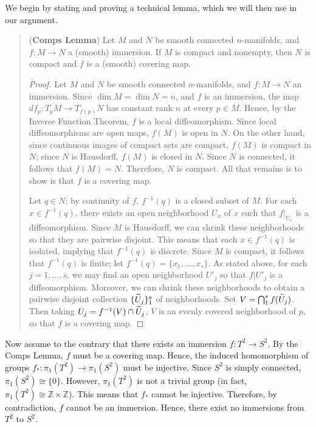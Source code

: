 \documentclass{article}
\begin{document}
\begin{solutions}
	We begin by stating and proving a technical lemma, which we will then use in our argument. 
		\begin{quote}
			(\textbf{Comps Lemma}) Let $M$ and $N$ be smooth connected $n$-manifolds, and $f: M \to N$ a (smooth) immersion. If $M$ is compact and nonempty, then $N$ is compact and $f$ is a (smooth) covering map. 
			
			\begin{proof}
				Let $M$ and $N$ be smooth connected $n$-manifolds, and $f:M \to N$ an immersion. Since $\dim{M} = \dim{N} = n$, and $f$ is an immersion, the map $df_{p}: T_{p}M \to T_{f(p)}N$ has constant rank $n$ at every $p \in M$. Hence, by the Inverse Function Theorem, $f$ is a local diffeomorphism. Since local diffeomorphisms are open maps, $f(M)$ is open in $N$. On the other hand, since continuous images of compact sets are compact, $f(M)$ is compact in $N$; since $N$ is Hausdorff, $f(M)$ is closed in $N$. Since $N$ is connected, it follows that $f(M) = N$. Therefore, $N$ is compact. All that remains is to show is that $f$ is a covering map. 
				
				Let $q \in N$; by continuity of $f$, $f^{-1}(q)$ is a closed subset of $M$. For each $x \in f^{-1}(q)$, there exists an open neighborhood $U_{x}$ of $x$ such that $f|_{U_{x}}$ is a diffeomorphism. Since $M$ is Hausdorff, we can shrink these neighborhoods so that they are pairwise disjoint. This means that each $x \in f^{-1}(q)$ is isolated, implying that $f^{-1}(q)$ is discrete. Since $M$ is compact, it follows that $f^{-1}(q)$ is finite; let $f^{-1}(q) = \{x_{1}, \ldots, x_{s}\}$. As stated above, for each $j= 1, \ldots, s$, we may find an open neighborhood $U'_{j}$ so that $f|U'_{j}$ is a diffeomorphism. Moreover, we can shrink these neighborhoods to obtain a pairwise disjoint collection $\{\widetilde{U}_{j}\}_{1}^{s}$ of neighborhoods. Set $V = \bigcap_{1}^{s}f(\widetilde{U}_{j})$. Then taking $U_{j} = f^{-1}(V) \cap \widetilde{U}_{j}$, $V$ is an evenly covered neighborhood of $p$, so that $f$ is a covering map. 
			\end{proof}
		\end{quote}
	Now assume to the contrary that there exists an immersion $f: T^{2} \to S^{2}$. By the Comps Lemma, $f$ must be a covering map. Hence, the induced homomorphism of groups $f_{\ast}: \pi_{1}(T^{2}) \to \pi_{1}(S^{2})$ must be injective. Since $S^{2}$ is simply connected, $\pi_{1}(S^{2}) \cong \{0\}$. However, $\pi_{1}(T^{2})$ is not a trivial group (in fact, $\pi_{1}(T^{2}) \cong \mathbb{Z} \times \mathbb{Z}$). This means that $f_{\ast}$ cannot be injective. Therefore, by contradiction, $f$ cannot be an immersion. Hence, there exist no immersions from $T^{2}$ to $S^{2}$. 
\end{solutions}
\end{document}
